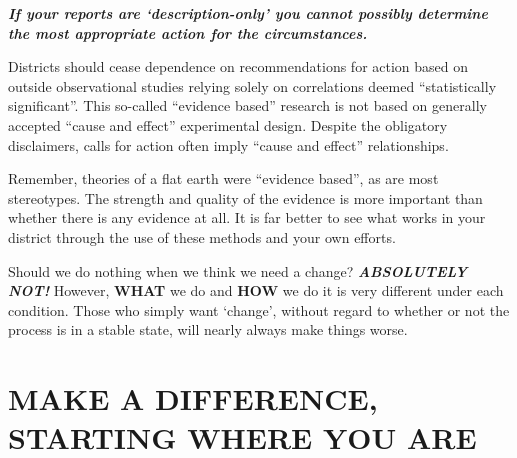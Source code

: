 \documentclass[
  letterpaper,
  DIV=11,
  numbers=noendperiod]{scrartcl}
\begin{document}
\textbf{\emph{If your reports are `description-only' you cannot possibly
determine the most appropriate action for the circumstances.}}

\begin{tcolorbox}[enhanced jigsaw, leftrule=.75mm, breakable, opacityback=0, toptitle=1mm, coltitle=black, opacitybacktitle=0.6, bottomrule=.15mm, colbacktitle=quarto-callout-warning-color!10!white, colframe=quarto-callout-warning-color-frame, arc=.35mm, bottomtitle=1mm, titlerule=0mm, title=\textcolor{quarto-callout-warning-color}{\faExclamationTriangle}\hspace{0.5em}{\textbf{\emph{Cautionary Note:}}}, colback=white, rightrule=.15mm, left=2mm, toprule=.15mm]

Districts should cease dependence on recommendations for action based on
outside observational studies relying solely on correlations deemed
``statistically significant''. This so-called ``evidence based''
research is not based on generally accepted ``cause and effect''
experimental design. Despite the obligatory disclaimers, calls for
action often imply ``cause and effect'' relationships.\footnotemark{}

Remember, theories of a flat earth were ``evidence based'', as are most
stereotypes. The strength and quality of the evidence is more important
than whether there is any evidence at all. It is far better to see what
works in your district through the use of these methods and your own
efforts.

\end{tcolorbox}


\vspace{0.3in}

Should we do nothing when we think we need a change?
\textbf{\emph{ABSOLUTELY NOT!}} However, \textbf{WHAT} we do and
\textbf{HOW} we do it is very different under each condition. Those who
simply want `change', without regard to whether or not the process is in
a stable state, will nearly always make things worse.

\vspace{0.3in}

\section{\texorpdfstring{\textbf{MAKE A DIFFERENCE, STARTING WHERE YOU
ARE}}{MAKE A DIFFERENCE, STARTING WHERE YOU ARE}}\label{make-a-difference-starting-where-you-are}
\end{document}
